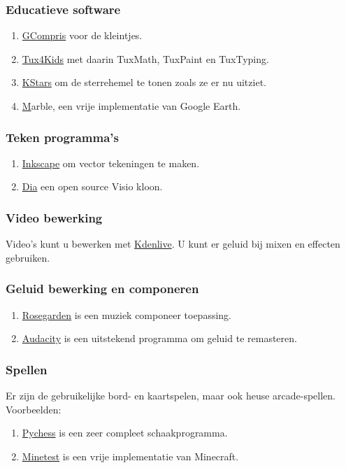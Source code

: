 \subsubsection{Educatieve software}
\begin{enumerate}
	\item \href{http://gcompris.net/index-en.html}{GCompris} voor de kleintjes.
	\item \href{http://tux4kids.alioth.debian.org/}{Tux4Kids} met daarin TuxMath, TuxPaint en TuxTyping.
	\item \href{https://edu.kde.org/kstars/}{KStars} om de sterrehemel te tonen zoals ze er nu uitziet.
	\item \href{https://edu.kde.org/marble/} Marble, een vrije implementatie van Google Earth.
\end{enumerate}

\subsubsection{Teken programma's}

\begin{enumerate}
	\item \href{https://inkscape.org/nl/}{Inkscape} om vector tekeningen te maken.
	\item \href{https://wiki.gnome.org/Apps/Dia}{Dia} een open source Visio kloon. 
\end{enumerate}

\subsubsection{Video bewerking}
Video's kunt u bewerken met \href{https://kdenlive.org/}{Kdenlive}. U kunt er geluid bij mixen en effecten gebruiken.

\subsubsection{Geluid bewerking en componeren}
\begin{enumerate}
	\item \href{http://www.rosegardenmusic.com/}{Rosegarden} is een muziek componeer toepassing.
	\item \href{http://audacity.sourceforge.net/}{Audacity} is een uitstekend programma om geluid te remasteren.
\end{enumerate}


\subsubsection{Spellen}
Er zijn de gebruikelijke bord- en kaartspelen, maar ook heuse arcade-spellen. Voorbeelden:
\begin{enumerate}
	\item \href{http://pychess.org/}{Pychess} is een zeer compleet schaakprogramma.
	\item \href{http://www.minetest.net/}{Minetest} is een vrije implementatie van Minecraft.
\end{enumerate}

